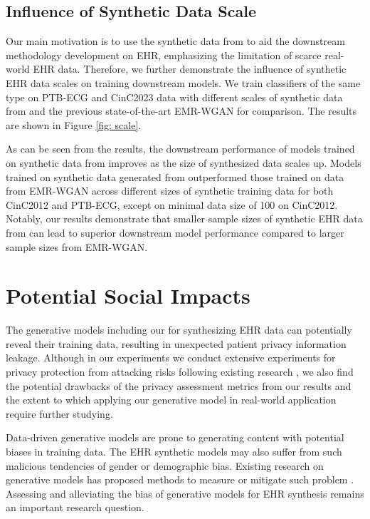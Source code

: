 \subsection{Influence of Synthetic Data Scale}

Our main motivation is to use the synthetic data from \modelname to aid the downstream methodology development on EHR, emphasizing the limitation of scarce real-world EHR data. Therefore, we further demonstrate the influence of synthetic EHR data scales on training downstream models. We train classifiers of the same type on PTB-ECG and CinC2023 data with different scales of synthetic data from \modelname and the previous state-of-the-art EMR-WGAN for comparison. The results are shown in Figure \ref{fig: scale}.

As can be seen from the results, the downstream performance of models trained on synthetic data from \modelname improves as the size of synthesized data scales up. Models trained on synthetic data generated from \modelname outperformed those trained on data from EMR-WGAN across different sizes of synthetic training data for both CinC2012 and PTB-ECG, except on minimal data size of 100 on CinC2012. Notably, our results demonstrate that smaller sample sizes of synthetic EHR data from \modelname can lead to superior downstream model performance compared to larger sample sizes from EMR-WGAN. 

\section{Potential Social Impacts}

The generative models including our \modelname for synthesizing EHR data can potentially reveal their training data, resulting in unexpected patient privacy information leakage. 
Although in our experiments we conduct extensive experiments for privacy protection from attacking risks following existing research \citep{Yan2022AMB}, we also find the potential drawbacks of the privacy assessment metrics from our results and the extent to which applying our generative model in real-world application require further studying.

Data-driven generative models are prone to generating content with potential biases in training data. 
The EHR synthetic models may also suffer from such malicious tendencies of gender or demographic bias. Existing research on generative models has proposed methods to measure \citep{Teo2021MeasuringFI} or mitigate such problem \citep{Grover2019BiasCO,Grover2019FairGM,Teo2022FairGM}. 
Assessing and alleviating the bias of generative models for EHR synthesis remains an important research question.

